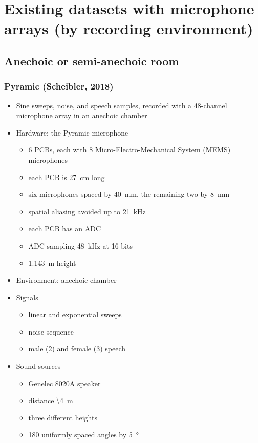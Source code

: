 \documentclass[14pt, oneside]{extarticle}
\begin{document}
\section{Existing datasets with microphone arrays (by recording environment)}

\subsection{Anechoic or semi-anechoic room}

\subsubsection{Pyramic (Scheibler, 2018)}

\begin{itemize}

\item Sine sweeps, noise, and speech samples, recorded with a 48-channel microphone array in an anechoic chamber \cite{scheibler2018pyramic}

\item Hardware: the Pyramic microphone \cite{scheibler2018pyramic}
	\begin{itemize}
	\item 6 PCBs, each with 8 Micro-Electro-Mechanical System (MEMS) microphones 
	\item each PCB is \SI{27}{\centi\metre} long
	\item six microphones spaced by \SI{40}{\milli\metre}, the remaining two by \SI{8}{\milli\metre}
	\item spatial aliasing avoided up to \SI{21}{\kilo\hertz}
	\item each PCB has an ADC
	\item ADC sampling \SI{48}{\kilo\hertz} at 16 bits
	\item \SI{1.143}{\metre} height
	\end{itemize}

\item Environment: anechoic chamber
	
\item Signals
	\begin{itemize}
	\item linear and exponential sweeps
	\item noise sequence
	\item male (2) and female (3) speech
	\end{itemize}

\item Sound sources
	\begin{itemize}
	\item Genelec 8020A speaker
	\item distance \textbackslash \SI{4}{\metre}
	\item three different heights
	\item 180 uniformly spaced angles by \SI{5}{\degree}
	\end{itemize}


\end{itemize}
\end{document}
